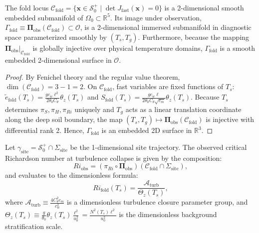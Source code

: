 \begin{corollary}
\label{cor:fold_image}
The fold locus $\mathcal{C}_{\mathrm{fold}} = \{\mathbf{x} \in \mathcal{S}_0^+ \mid \det J_{\mathrm{fast}}(\mathbf{x}) = 0\}$ is a 2-dimensional smooth embedded submanifold of $\Omega_0 \subset \mathbb{R}^5$. Its image under observation, $\Gamma_{\mathrm{fold}} \equiv \boldsymbol{\Pi}_{\mathrm{obs}}(\mathcal{C}_{\mathrm{fold}}) \subset \mathcal{O}$, is a 2-dimensional immersed submanifold in diagnostic space parameterized smoothly by $(T_s, T_g)$. Furthermore, because the mapping $\boldsymbol{\Pi}_{\mathrm{obs}}\vert_{\mathcal{C}_{\mathrm{fold}}}$ is globally injective over physical temperature domains, $\Gamma_{\mathrm{fold}}$ is a smooth embedded 2-dimensional surface in $\mathcal{O}$.
\end{corollary}

\begin{proof}
By Fenichel theory and the regular value theorem, $\dim(\mathcal{C}_{\mathrm{fold}}) = 3 - 1 = 2$. On $\mathcal{C}_{\mathrm{fold}}$, fast variables are fixed functions of $T_s$: $\tilde e_{\mathrm{fold}}(T_s) = \frac{g c_w \ell^2}{2\theta_0 C_\theta}\theta_z(T_s)$ and $S_{\mathrm{fold}}(T_s) = \frac{g c_w \ell}{2\theta_0 C_\theta \sqrt{c_m}}\theta_z(T_s)$. Because $T_s$ determines $\pi_S, \pi_H, \pi_{Ri}$ uniquely and $T_g$ acts as a linear translation coordinate along the deep soil boundary, the map $(T_s, T_g) \mapsto \boldsymbol{\Pi}_{\mathrm{obs}}(\mathcal{C}_{\mathrm{fold}})$ is injective with differential rank 2. Hence, $\Gamma_{\mathrm{fold}}$ is an embedded 2D surface in $\mathbb{R}^3$.
\end{proof}

\begin{corollary}
\label{cor:ri_formula}
Let $\gamma_{\mathrm{site}} = \mathcal{S}_0^+ \cap \Sigma_{\mathrm{site}}$ be the 1-dimensional site trajectory. The observed critical Richardson number at turbulence collapse is given by the composition:
\begin{equation}
Ri_{\mathrm{obs}} = \left(\pi_{Ri} \circ \boldsymbol{\Pi}_{\mathrm{obs}}\right)\left(\mathcal{C}_{\mathrm{fold}} \cap \Sigma_{\mathrm{site}}\right),
\label{eq:ri_composition}
\end{equation}
and evaluates to the dimensionless formula:
\begin{equation}
Ri_{\mathrm{fold}}(T_s) = \frac{\mathcal{A}_{\mathrm{turb}}}{\Theta_z(T_s)},
\label{eq:Ri_fold_nondim}
\end{equation}
where $\mathcal{A}_{\mathrm{turb}} \equiv \frac{4 C_\theta^2 c_m}{c_w^2}$ is a dimensionless turbulence closure parameter group, and $\Theta_z(T_s) \equiv \frac{g}{\theta_0} \theta_z(T_s) \frac{\ell^2}{u_0^2} = \frac{N^2(T_s) \ell^2}{u_0^2}$ is the dimensionless background stratification scale.
\end{corollary}

